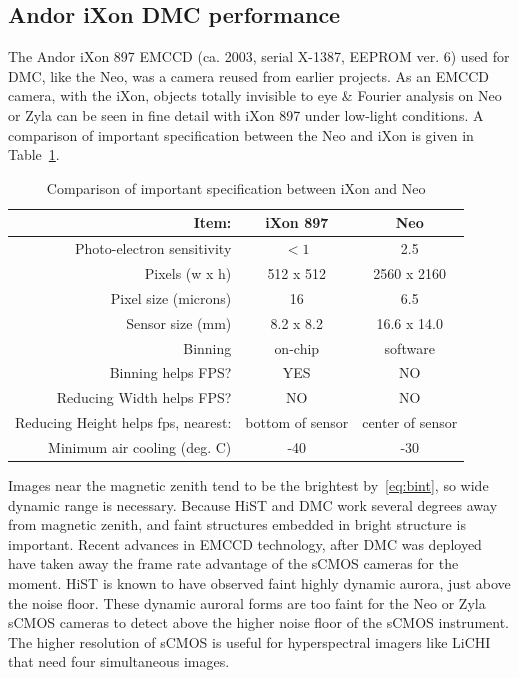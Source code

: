 \subsection{Andor iXon DMC performance}
The Andor iXon 897 EMCCD (ca. 2003, serial X-1387, EEPROM ver. 6) used for DMC, like the Neo, was a camera reused from earlier projects.
As an EMCCD camera, with the iXon, objects totally invisible to eye \& Fourier analysis on Neo or Zyla can be seen in fine detail with iXon 897 under low-light conditions.
A comparison of important specification between the Neo and iXon is given in Table~\ref{tab:neoixon}.
\begin{table}\centering
	\caption{Comparison of important specification between iXon and Neo}\label{tab:neoixon}
	\begin{tabular}{rcc}
		\toprule
		Item: & iXon 897 & Neo \\
		\midrule
		Photo-electron sensitivity & $<1$ & 2.5 \\
		Pixels (w x h) & 512 x 512 & 2560 x 2160 \\
		Pixel size (microns) & 16 & 6.5 \\
		Sensor size (mm) & 8.2 x 8.2 & 16.6 x 14.0 \\
		Binning & on-chip & software \\
		Binning helps FPS? & YES & NO \\
		Reducing Width helps FPS? & NO & NO  \\
		Reducing Height helps fps, nearest: & bottom of sensor & center of sensor \\
		Minimum air cooling (deg. C) & -40 & -30 \\
		\bottomrule
	\end{tabular}
\end{table}
Images near the magnetic zenith tend to be the brightest by~\eqref{eq:bint}, so wide dynamic range is necessary. 
Because HiST and DMC work several degrees away from magnetic zenith, and faint structures embedded in bright structure is important.
Recent advances in EMCCD technology, after DMC was deployed have taken away the frame rate advantage of the sCMOS cameras for the moment.
HiST is known to have observed faint highly dynamic aurora, just above the noise floor.
These dynamic auroral forms are too faint for the Neo or Zyla sCMOS cameras to detect above the higher noise floor of the sCMOS instrument.
The higher resolution of sCMOS is useful for hyperspectral imagers like LiCHI \citep{goenka2016} that need four simultaneous images.
